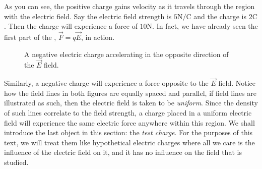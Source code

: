 As you can see, the positive charge gains velocity as it travels through the region with the electric field. Say the electric field strength is \(5\si{\newton\per\coulomb}\) and the charge is \(2\si{\coulomb}\). Then the charge will experience a force of \(10\si{\newton}\). In fact, we have already seen the first part of the , \(\vec{F}=q\vec{E}\), in action.
\begin{figure}[H]
  \centering
  \caption{A negative electric charge accelerating in the opposite direction of the \(\vec{E}\) field.}
\end{figure}


Similarly, a negative charge will experience a force opposite to the \(\vec{E}\) field. Notice how the field lines in both figures are equally spaced and parallel, if field lines are illustrated as such, then the electric field is taken to be \emph{uniform}. Since the density of such lines correlate to the field strength, a charge placed in a uniform electric field will experience the same electric force anywhere within this region. We shall introduce the last object in this section: the \textit{test charge}. For the purposes of this text, we will treat them like hypothetical electric charges where all we care is the influence of the electric field on it, and it has no influence on the field that is studied.

